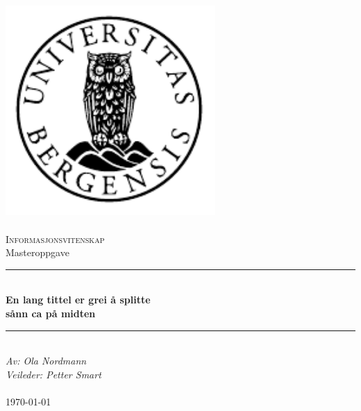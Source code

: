 \documentclass[12pt]{article}
\begin{document}
\maketitle

\newcommand{\blankpage}{\newpage{}\thispagestyle{empty}\mbox{}\newpage{}}
\newcommand{\HRule}{\rule{\linewidth}{0.5mm}}

\begin{titlepage}
\begin{center}
\includegraphics[width=8cm]{img/uib-emblem-svart} \\[0.5cm]
\paragraph*{}

\textsc{\Large Informasjonsvitenskap}\\[0.5cm]
\Large Masteroppgave \\[0.4cm]
\HRule \\[0.4cm]
{ \huge \bfseries En lang tittel er grei å splitte  \\ sånn ca på midten}\\[0.5cm]
\HRule \\[1.0cm]

\emph{Av: Ola Nordmann}\\
\emph{Veileder: Petter Smart}\\

\paragraph*{}
\end{center}
\vfill
\begin{center}
{\large \today}
\end{center}
\end{titlepage}
\end{document}
